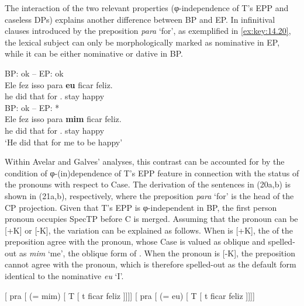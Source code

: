 \documentclass[output=paper]{langsci/langscibook}
\begin{document}
The interaction of the two relevant properties (φ-independence of T’s
\gls{EPP}
and caseless DPs) explains another difference between \gls{BP} and EP. In
infinitival clauses introduced by the preposition \emph{para} ‘for’, as
exemplified in \eqref{ex:key:14.20}, the lexical subject can only be
morphologically marked as nominative in EP, while it can be either nominative
or dative in BP.

\ea\label{ex:key:14.20}
    \ea     \gls{BP}: ok -- \gls{EP}: ok\\
    \gll    Ele fez isso para \textbf{eu} ficar feliz.\\
            he did that for \Fsg.\Nom{} stay happy\\
    \ex     \gls{BP}: ok -- \gls{EP}: *\\
    \gll    Ele fez isso para \textbf{mim} ficar feliz.\\
            he did that for \Fsg.\Dat{} stay happy\\
    \glt    ‘He did that for me to be happy’
    \z
\z

Within Avelar and Galves’ analyses, this contrast can be accounted for by
the condition of φ-(in)dependence of T’s \gls{EPP} feature in connection with
the status of the pronouns with respect to Case. The derivation of the
sentences in (20a,b) is shown in (21a,b), respectively, where the preposition
\emph{para} ‘for’ is the head of the CP projection. Given that T’s \gls{EPP} is
φ-independent in BP, the first person pronoun occupies SpecTP before C is
merged. Assuming that the pronoun can be [+K] or [-K], the variation can be
explained as follows. When \Fsg{} is [+K], the  of the preposition agree
with the pronoun, whose Case is valued as oblique and spelled-out as \emph{mim}
‘me’, the oblique form of \Fsg. When the pronoun is [-K], the preposition
cannot agree with the pronoun, which is therefore spelled-out as the default
form identical to the nominative \emph{eu} ‘I’.

\ea%
    \label{ex:key:14.21}
    \ea     {}[ pra [ \Fsg{} (= mim) [ T [ t ficar feliz ]]]]
    \ex     {}[ pra [ \Fsg{} (= eu) [ T [ t ficar feliz ]]]]
    \z
\z
\end{document}
